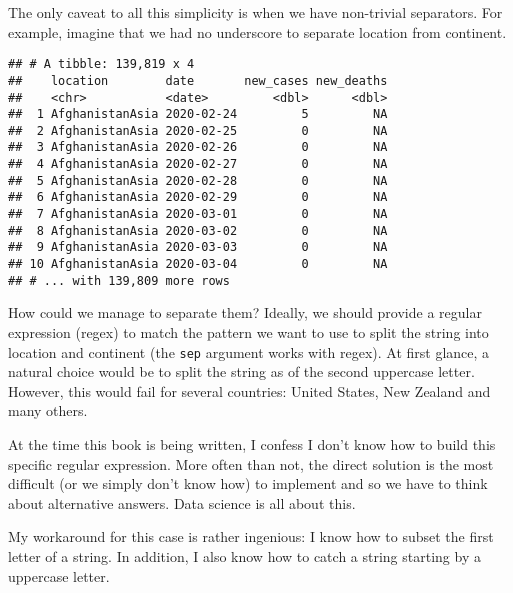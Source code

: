 \documentclass[
]{book}
\begin{document}
The only caveat to all this simplicity is when we have non-trivial separators. For example, imagine that we had no underscore to separate location from continent.

\begin{verbatim}
## # A tibble: 139,819 x 4
##    location        date       new_cases new_deaths
##    <chr>           <date>         <dbl>      <dbl>
##  1 AfghanistanAsia 2020-02-24         5         NA
##  2 AfghanistanAsia 2020-02-25         0         NA
##  3 AfghanistanAsia 2020-02-26         0         NA
##  4 AfghanistanAsia 2020-02-27         0         NA
##  5 AfghanistanAsia 2020-02-28         0         NA
##  6 AfghanistanAsia 2020-02-29         0         NA
##  7 AfghanistanAsia 2020-03-01         0         NA
##  8 AfghanistanAsia 2020-03-02         0         NA
##  9 AfghanistanAsia 2020-03-03         0         NA
## 10 AfghanistanAsia 2020-03-04         0         NA
## # ... with 139,809 more rows
\end{verbatim}

How could we manage to separate them? Ideally, we should provide a regular expression (regex) to match the pattern we want to use to split the string into location and continent (the \texttt{sep} argument works with regex). At first glance, a natural choice would be to split the string as of the second uppercase letter. However, this would fail for several countries: United States, New Zealand and many others.

At the time this book is being written, I confess I don't know how to build this specific regular expression. More often than not, the direct solution is the most difficult (or we simply don't know how) to implement and so we have to think about alternative answers. Data science is all about this.

My workaround for this case is rather ingenious: I know how to subset the first letter of a string. In addition, I also know how to catch a string starting by a uppercase letter.
\end{document}
